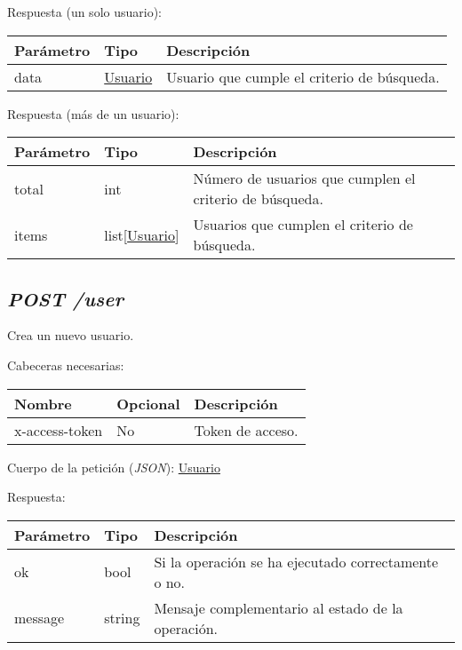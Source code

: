 Respuesta (un solo usuario):
\begin{table}[h!]
	\centering
	\begin{adjustbox}{max width=\textwidth}
	\begin{tabular}{|l|l|l|}
		\hline
		Parámetro & Tipo & Descripción \\ \hline
		data & \hyperref[sec:usuario]{Usuario} & Usuario que cumple el criterio de búsqueda. \\ \hline
	\end{tabular}
\end{adjustbox}
\end{table}

Respuesta (más de un usuario):
\begin{table}[h!]
	\centering
	\begin{adjustbox}{max width=\textwidth}
	\begin{tabularx}{\linewidth}{|l|l|L|}
		\hline
		Parámetro & Tipo & Descripción \\ \hline
		total & int & Número de usuarios que cumplen el criterio de búsqueda. \\ \hline
		items & list[\hyperref[sec:usuario]{Usuario}] & Usuarios que cumplen el criterio de búsqueda. \\ \hline
	\end{tabularx}
\end{adjustbox}
\end{table}

\subsection{\textit{POST /user}}
Crea un nuevo usuario.

Cabeceras necesarias:
\begin{table}[h!]
	\centering
	\begin{adjustbox}{max width=\textwidth}
	\begin{tabular}{|l|l|l|}
		\hline
		Nombre & Opcional & Descripción \\ \hline
		x-access-token & No & Token de acceso. \\ \hline
	\end{tabular}
\end{adjustbox}
\end{table}

Cuerpo de la petición (\textit{JSON}): \hyperref[sec:usuario]{Usuario}

Respuesta:
\begin{table}[h!]
	\centering
	\begin{adjustbox}{max width=\textwidth}
	\begin{tabular}{|l|l|l|}
		\hline
		Parámetro & Tipo & Descripción \\ \hline
		ok & bool & Si la operación se ha ejecutado correctamente o no. \\ \hline
		message & string & Mensaje complementario al estado de la operación. \\ \hline
	\end{tabular}
\end{adjustbox}
\end{table}



